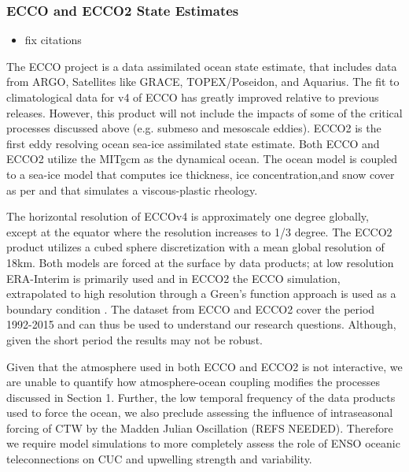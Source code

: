 \subsubsection{ECCO and ECCO2 State Estimates}
\color{red}
\begin{itemize}
    \item fix citations
\end{itemize}
\color{black}

The ECCO project \citep{forget2015} is a data assimilated ocean state estimate, that includes data from ARGO, Satellites like GRACE, TOPEX/Poseidon, and Aquarius.   The fit to climatological data for v4 of ECCO has greatly improved relative to previous releases.  However, this product will not include the impacts of some of the critical processes discussed above (e.g. submeso and mesoscale eddies).  ECCO2 \citep{menemenlis2005using,menemenlis2005nasa} is the first eddy resolving ocean sea-ice assimilated state estimate.  Both ECCO and ECCO2 utilize the MITgcm \citet{marshall1997finite} as the dynamical ocean. The ocean model is coupled to a sea-ice model that computes ice thickness, ice concentration,and snow cover as per \citet{zhang1997efficient} and that simulates a viscous-plastic rheology.  

The horizontal resolution of ECCOv4 is approximately one degree globally, except at the equator where the resolution increases to 1/3 degree.  The ECCO2 product utilizes a cubed sphere discretization \citep{adcroft2004implementation} with a mean global resolution of 18km.  Both models are forced at the surface by data products; at low resolution ERA-Interim is primarily used \citep{forget2015} and in ECCO2 the ECCO simulation, extrapolated to high resolution through a Green's function approach \citet{menemenlis2005using} is used as a boundary condition \citet{menemenlis2005nasa}.  The dataset from ECCO and ECCO2 cover the period 1992-2015 and can thus be used to understand our research questions.  Although, given the short period the results may not be robust.

Given that the atmosphere used in both ECCO and ECCO2 is not interactive, we are unable to quantify how atmosphere-ocean coupling modifies the processes discussed in Section 1.  Further, the low temporal frequency of the data products used to force the ocean, we also preclude assessing the influence of intraseasonal forcing of CTW by the Madden Julian Oscillation (REFS NEEDED).  Therefore we require model simulations to more completely assess the role of ENSO oceanic teleconnections on CUC and upwelling strength and variability.

